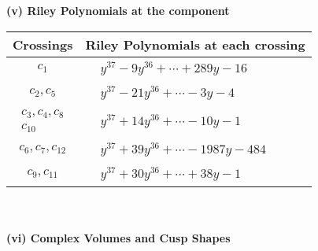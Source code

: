 \documentclass[1p]{elsarticle_modified}
\theoremstyle{definition}
\begin{document}
\newpage\renewcommand{\arraystretch}{1}
\flushleft \textbf{(v) Riley Polynomials at the component}\newline \\
\begin{tabular}{m{50pt}|m{274pt}}
Crossings & \hspace{64pt}Riley Polynomials at each crossing \\
\hline $$\begin{aligned}c_{1}\end{aligned}$$&$\begin{aligned}
&y^{37}-9 y^{36}+\cdots+289 y-16
\end{aligned}$\\
\hline $$\begin{aligned}c_{2},c_{5}\end{aligned}$$&$\begin{aligned}
&y^{37}-21 y^{36}+\cdots-3 y-4
\end{aligned}$\\
\hline $$\begin{aligned}c_{3},c_{4},c_{8}\\c_{10}\end{aligned}$$&$\begin{aligned}
&y^{37}+14 y^{36}+\cdots-10 y-1
\end{aligned}$\\
\hline $$\begin{aligned}c_{6},c_{7},c_{12}\end{aligned}$$&$\begin{aligned}
&y^{37}+39 y^{36}+\cdots-1987 y-484
\end{aligned}$\\
\hline $$\begin{aligned}c_{9},c_{11}\end{aligned}$$&$\begin{aligned}
&y^{37}+30 y^{36}+\cdots+38 y-1
\end{aligned}$\\
\hline
\end{tabular}\\~\\
\newpage\flushleft \textbf{(vi) Complex Volumes and Cusp Shapes}
\end{document}
